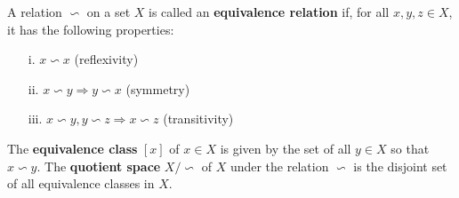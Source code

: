 \begin{definition} 
    A relation $\backsim$ on a set $X$ is called an \textbf{equivalence
    relation} if, for all $x,y,z \in X$, it has the following properties:
    \begin{itemize}[noitemsep,topsep=0pt]
        \item[i.] $x \backsim x$ (reflexivity)
        \item[ii.] $x \backsim y \Rightarrow y \backsim x$ (symmetry)
        \item[iii.] $x \backsim y, y \backsim z \Rightarrow x \backsim z$
        (transitivity)
    \end{itemize}
    The \textbf{equivalence class} $[x]$ of $x \in X$ is given by the set of
    all $y \in X$ so that $x \backsim y$.
    The \textbf{quotient space} $X \big/ {\backsim}$ of $X$ under the relation
    $\backsim$ is the disjoint set of all equivalence classes in $X$. 
\end{definition}

